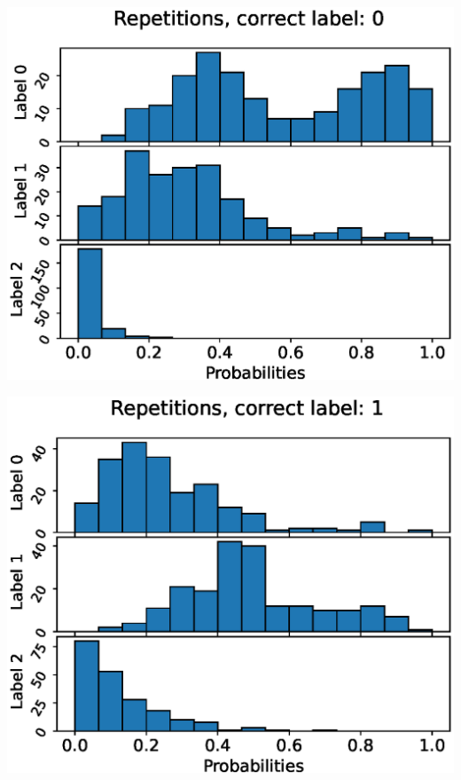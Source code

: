 \begin{center}
\begin{minipage}{0.33\textwidth}
  \includegraphics[width=\textwidth]{files/figs/app/hists/femval/r0.eps}
\end{minipage}%
\begin{minipage}{0.33\textwidth}
  \includegraphics[width=\textwidth]{files/figs/app/hists/femval/r1.eps}
\end{minipage}%
\begin{minipage}{0.33\textwidth}

\end{minipage}
\end{center}

